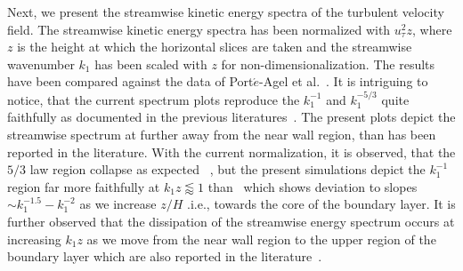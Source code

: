 \documentclass[times]{fldauth}
\begin{document}
\par
Next, we present the streamwise kinetic energy spectra of the turbulent velocity field. The streamwise kinetic energy spectra has been normalized with $u_\tau^{2} z$, where $z$ is the height at which the horizontal slices are taken and the streamwise wavenumber $k_{1}$ has been scaled with $z$ for non-dimensionalization. The results have been compared against the data of Port$\acute{e}$-Agel et al.~\cite{porte1fun}. It is intriguing to notice, that the current spectrum plots reproduce the $k_{1}^{-1}$ and $k_{1}^{-5/3}$ quite faithfully as documented in the previous literatures~\cite{kader,katul}. The present plots depict the streamwise spectrum at further away from the near wall region, than has been reported in the literature. With the current normalization, it is observed, that the $5/3$ law region collapse as expected ~\cite{katul,porte1fun}, but the present simulations depict the $k_{1}^{-1}$ region far more faithfully at $k_{1}z \lessapprox 1$ than~\cite{porte1fun} which shows deviation to slopes $\sim k_{1}^{-1.5} -k_{1}^{-2}$ as we increase $z/H$ .i.e., towards the core of the boundary layer. It is further observed that the dissipation of the streamwise energy spectrum occurs at increasing $k_{1}z$ as we move from the near wall region to the upper region of the boundary layer which are also reported in the literature~\cite{kader,katul,porte1fun,bou1}.
\end{document}
